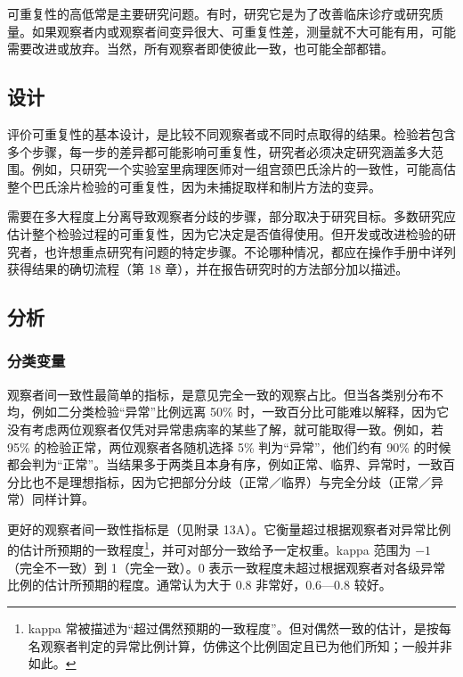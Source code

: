 可重复性的高低常是主要研究问题。有时，研究它是为了改善临床诊疗或研究质量。如果观察者内或观察者间变异很大、可重复性差，测量就不大可能有用，可能需要改进或放弃。当然，所有观察者即使彼此一致，也可能全部都错。

\subsection{设计}
评价可重复性的基本设计，是比较不同观察者或不同时点取得的结果。检验若包含多个步骤，每一步的差异都可能影响可重复性，研究者必须决定研究涵盖多大范围。例如，只研究一个实验室里病理医师对一组宫颈巴氏涂片的一致性，可能高估整个巴氏涂片检验的可重复性，因为未捕捉取样和制片方法的变异。

需要在多大程度上分离导致观察者分歧的步骤，部分取决于研究目标。多数研究应估计整个检验过程的可重复性，因为它决定是否值得使用。但开发或改进检验的研究者，也许想重点研究有问题的特定步骤。不论哪种情况，都应在操作手册中详列获得结果的确切流程（第 18 章），并在报告研究时的方法部分加以描述。

\subsection{分析}
\subsubsection{分类变量}
观察者间一致性最简单的指标，是意见完全一致的观察占比。但当各类别分布不均，例如二分类检验“异常”比例远离 50\% 时，一致百分比可能难以解释，因为它没有考虑两位观察者仅凭对异常患病率的某些了解，就可能取得一致。例如，若 95\% 的检验正常，两位观察者各随机选择 5\% 判为“异常”，他们约有 90\% 的时候都会判为“正常”。当结果多于两类且本身有序，例如正常、临界、异常时，一致百分比也不是理想指标，因为它把部分分歧（正常／临界）与完全分歧（正常／异常）同样计算。

更好的观察者间一致性指标是（见附录 13A）。它衡量超过根据观察者对异常比例的估计所预期的一致程度\footnote{kappa 常被描述为“超过偶然预期的一致程度”。但对偶然一致的估计，是按每名观察者判定的异常比例计算，仿佛这个比例固定且已为他们所知；一般并非如此。}，并可对部分一致给予一定权重。kappa 范围为 $-1$（完全不一致）到 1（完全一致）。0 表示一致程度未超过根据观察者对各级异常比例的估计所预期的程度。通常认为大于 0.8 非常好，0.6—0.8 较好。

